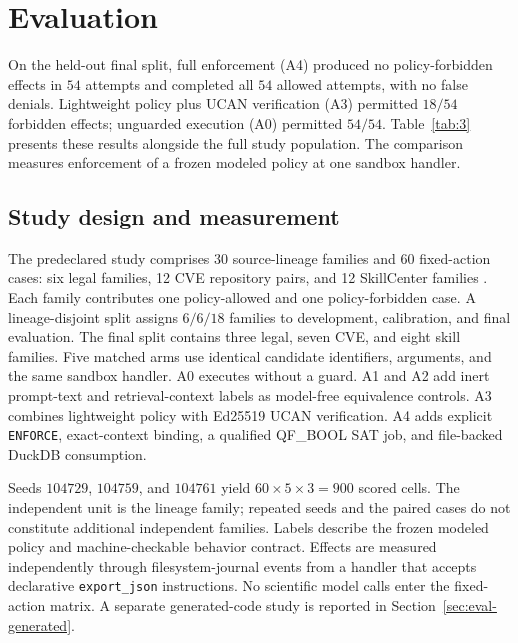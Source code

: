\section{Evaluation}
\label{sec:eval}

On the held-out final split, full enforcement (A4) produced no policy-forbidden effects in $54$ attempts and completed all $54$ allowed attempts, with no false denials. Lightweight policy plus UCAN verification (A3) permitted $18/54$ forbidden effects; unguarded execution (A0) permitted $54/54$. Table~\ref{tab:3} presents these results alongside the full study population. The comparison measures enforcement of a frozen modeled policy at one sandbox handler.

\subsection{Study design and measurement}
\label{sec:eval-protocol}

The predeclared study comprises $30$ source-lineage families and $60$ fixed-action cases: six legal families, 12 CVE repository pairs, and 12 SkillCenter families \citep{cvefixes}. Each family contributes one policy-allowed and one policy-forbidden case. A lineage-disjoint split assigns $6/6/18$ families to development, calibration, and final evaluation. The final split contains three legal, seven CVE, and eight skill families. Five matched arms use identical candidate identifiers, arguments, and the same sandbox handler. A0 executes without a guard. A1 and A2 add inert prompt-text and retrieval-context labels as model-free equivalence controls. A3 combines lightweight policy with Ed25519 UCAN verification. A4 adds explicit \texttt{ENFORCE}, exact-context binding, a qualified QF\_BOOL SAT job, and file-backed DuckDB consumption.

Seeds $104729$, $104759$, and $104761$ yield $60\times5\times3=900$ scored cells. The independent unit is the lineage family; repeated seeds and the paired cases do not constitute additional independent families. Labels describe the frozen modeled policy and machine-checkable behavior contract. Effects are measured independently through filesystem-journal events from a handler that accepts declarative \texttt{export\_json} instructions. No scientific model calls enter the fixed-action matrix. A separate generated-code study is reported in Section~\ref{sec:eval-generated}.

